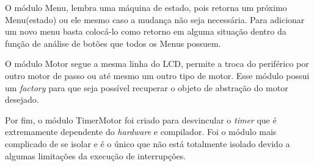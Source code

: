 O módulo Menu, lembra uma máquina de estado, pois retorna um próximo Menu(estado) ou ele mesmo caso a mudança não seja necessária. Para adicionar um novo menu basta colocá-lo como retorno em alguma situação dentro da função de análise de botões que todos os Menus possuem.

O módulo Motor segue a mesma linha do LCD, permite a troca do periférico por outro motor de passo ou até mesmo um outro tipo de motor. Esse módulo possui um \emph{factory} para que seja possível recuperar o objeto de abstração do motor desejado.

Por fim, o módulo TimerMotor foi criado para desvincular o \emph{timer} que é extremamente dependente do \emph{hardware} e compilador. Foi o módulo mais complicado de se isolar e é o único que não está totalmente isolado devido a algumas limitações da execução de interrupções.
